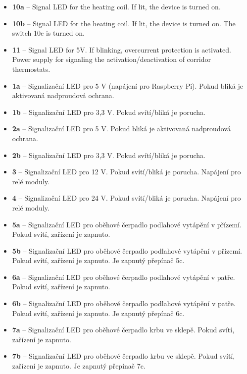 \begin{English}
\begin{itemize}
  \item \textbf{10a} – Signal LED for the heating coil. If lit, the device is turned on.
  \item \textbf{10b} – Signal LED for the heating coil. If lit, the device is turned on. The switch 10c is turned on.
    \item \textbf{11} – Signal LED for 5V. If blinking, overcurrent protection is activated. Power supply for signaling the activation/deactivation of corridor thermostats.
\end{itemize}
\end{English}

\begin{Czech}
\begin{itemize}
  \item \textbf{1a} – Signalizační LED pro 5 V (napájení pro Raspberry Pi). Pokud bliká je aktivovaná nadproudová ochrana.
  \item \textbf{1b} – Signalizační LED pro 3,3 V. Pokud svítí/bliká je porucha.
  \item \textbf{2a} – Signalizační LED pro 5 V. Pokud bliká je aktivovaná nadproudová ochrana.
  \item \textbf{2b} – Signalizační LED pro 3,3 V. Pokud svítí/bliká je porucha.
  \item \textbf{3} – Signalizační LED pro 12 V. Pokud svítí/bliká je porucha. Napájení pro relé moduly.
  \item \textbf{4} – Signalizační LED pro 24 V. Pokud svítí/bliká je porucha. Napájení pro relé moduly.
  \item \textbf{5a} – Signalizační LED pro oběhové čerpadlo podlahové vytápění v přízemí. Pokud svítí, zařízení je zapnuto. 
    \item \textbf{5b} – Signalizační LED pro oběhové čerpadlo podlahové vytápění v přízemí. Pokud svítí, zařízení je zapnuto. Je zapnutý přepínač 5c.
  \item \textbf{6a} – Signalizační LED pro oběhové čerpadlo podlahové vytápění v patře. Pokud svítí, zařízení je zapnuto.
    \item \textbf{6b} – Signalizační LED pro oběhové čerpadlo podlahové vytápění v patře. Pokud svítí, zařízení je zapnuto. Je zapnutý přepínač 6c.
  \item \textbf{7a} – Signalizační LED pro oběhové čerpadlo krbu ve sklepě. Pokud svítí, zařízení je zapnuto.
    \item \textbf{7b} – Signalizační LED pro oběhové čerpadlo krbu ve sklepě. Pokud svítí, zařízení je zapnuto. Je zapnutý přepínač 7c.

\end{itemize}
\end{Czech}
